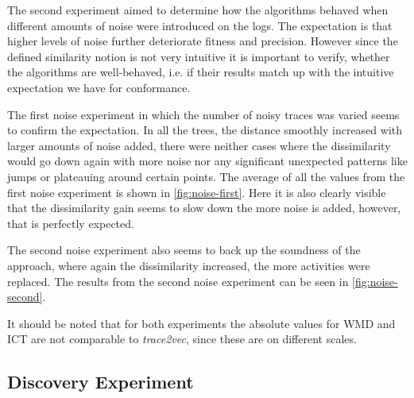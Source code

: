 \documentclass[runningheads]{template/llncs}
\begin{document}
The second experiment aimed to determine how the algorithms behaved when different amounts of noise were introduced on the logs.
The expectation is that higher levels of noise further deteriorate fitness and precision. 
However since the defined similarity notion is not very intuitive it is important to verify, whether the algorithms are well-behaved, i.e. if their results match up with the intuitive expectation we have for conformance.

The first noise experiment in which the number of noisy traces was varied seems to confirm the expectation.
In all the trees, the distance smoothly increased with larger amounts of noise added, there were neither cases where the dissimilarity would go down again with more noise nor any significant unexpected patterns like jumps or plateauing around certain points.
The average of all the values from the first noise experiment is shown in \cref{fig:noise-first}.
Here it is also clearly visible that the dissimilarity gain seems to slow down the more noise is added, however, that is perfectly expected. 

The second noise experiment also seems to back up the soundness of the approach, where again the dissimilarity increased, the more activities were replaced.
The results from the second noise experiment can be seen in \cref{fig:noise-second}.

It should be noted that for both experiments the absolute values for WMD and ICT are not comparable to \emph{trace2vec}, since these are on different scales.

\subsection{Discovery Experiment}
\end{document}
